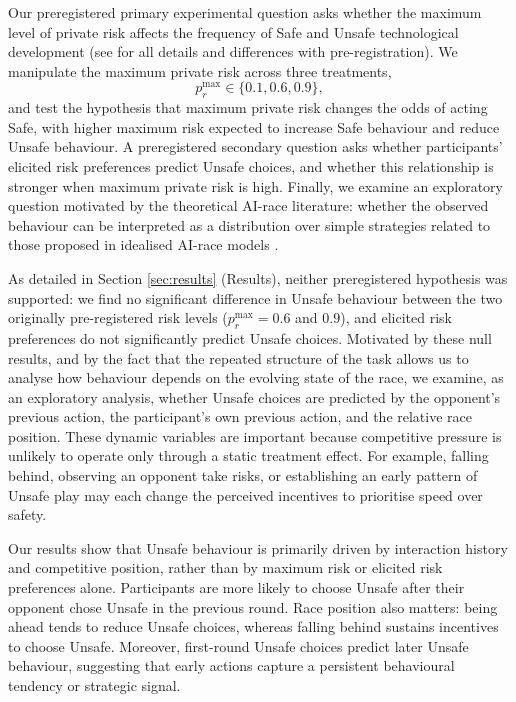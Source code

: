 \documentclass[pdflatex,sn-mathphys-ay]{sn-jnl}
\theoremstyle{thmstyleone}
\theoremstyle{thmstyletwo}
\theoremstyle{thmstylethree}
\begin{document}
Our preregistered primary experimental question asks whether the maximum level of private risk affects the frequency of Safe and Unsafe technological development (see  for all details and differences with pre-registration). We manipulate the maximum private risk across three treatments,
\[
p_r^{\max}\in\{0.1,0.6,0.9\},
\]
and test the hypothesis that maximum private risk changes the odds of acting Safe, with higher maximum risk expected to increase Safe behaviour and reduce Unsafe behaviour. A preregistered secondary question asks whether participants' elicited risk preferences predict Unsafe choices, and whether this relationship is stronger when maximum private risk is high. Finally, we examine an exploratory question motivated by the theoretical AI-race literature: whether the observed behaviour can be interpreted as a distribution over simple strategies related to those proposed in idealised AI-race models \citep{han2020toRegulateOrNot}.

As detailed in Section \ref{sec:results} (Results), neither preregistered hypothesis was supported: we find no significant difference in Unsafe behaviour between the two originally pre-registered risk levels ($p_r^{\max}=0.6$ and $0.9$), and elicited risk preferences do not significantly predict Unsafe choices. Motivated by these null results, and by the fact that the repeated structure of the task allows us to analyse how behaviour depends on the evolving state of the race, we examine, as an exploratory analysis, whether Unsafe choices are predicted by the opponent's previous action, the participant's own previous action, and the relative race position. These dynamic variables are important because competitive pressure is unlikely to operate only through a static treatment effect. For example, falling behind, observing an opponent take risks, or establishing an early pattern of Unsafe play may each change the perceived incentives to prioritise speed over safety.

Our results show that Unsafe behaviour is primarily driven by interaction history and competitive position, rather than by maximum risk or elicited risk preferences alone. Participants are more likely to choose Unsafe after their opponent chose Unsafe in the previous round. Race position also matters: being ahead tends to reduce Unsafe choices, whereas falling behind sustains incentives to choose Unsafe. Moreover, first-round Unsafe choices predict later Unsafe behaviour, suggesting that early actions capture a persistent behavioural tendency or strategic signal.
\end{document}
